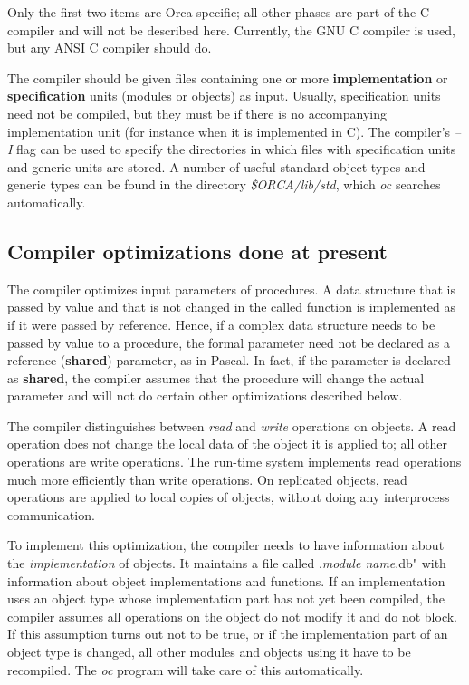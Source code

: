 \documentclass[10pt]{article}
\begin{document}
Only the first two items are Orca-specific; all other phases are part of the
C compiler and will not be described here.
Currently, the GNU C compiler is used, but any ANSI C compiler should do.

The compiler should be given files containing one or more
{\bf implementation}
or
{\bf specification}
units (modules or objects) as input.
Usually, specification units need not be compiled, but they must be if there
is no accompanying implementation unit (for instance when it is implemented
in C).
The compiler's 
{\em --I}
flag can be used to specify the directories in which
files with specification units and generic units are stored.
A number of useful standard object types and generic types can be found
in the directory
{\em \$ORCA/lib/std},
which
{\em oc}
searches automatically.

\subsection{Compiler optimizations done at present}

The compiler optimizes input parameters of procedures.
A data structure that is passed by value and that is not changed in the
called function is implemented as if it were passed by reference.
Hence, if a complex data structure needs to be passed by value to
a procedure, the formal parameter need not be declared as a reference
({\bf shared}) parameter, as in Pascal. In fact, if the parameter
is declared as 
{\bf shared},
the compiler assumes that the procedure will
change the actual parameter and will not do certain other optimizations
described below.

The compiler distinguishes between
{\em read}
and
{\em write}
operations on objects.
A read operation does not change the local data of the object it is
applied to; all other operations are write operations.
The run-time system implements read operations much
more efficiently than write operations.
On replicated objects, read operations are applied to local copies of
objects, without doing any interprocess communication.

To implement this optimization,
the compiler needs to have information about the 
{\em implementation}
of objects.
It maintains a file called 
.{\em module name}.db"
with information about object implementations and functions.
If an implementation uses an object type whose implementation part
has not yet been compiled, the compiler assumes all operations on the
object do not modify it and do not block.
If this assumption turns out not to be true, or
if the implementation part of an object type is changed, all other
modules and objects using it have to be recompiled.
The 
{\em oc}
program will take care of this automatically.
\end{document}
